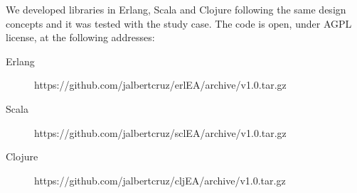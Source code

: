 
We developed libraries in Erlang, Scala and Clojure following the same design concepts and it was tested with the study case. The code is open, under AGPL license, at the following addresses:

\begin{description}
  \item[Erlang]  https://github.com/jalbertcruz/erlEA/archive/v1.0.tar.gz
  \item[Scala]   https://github.com/jalbertcruz/sclEA/archive/v1.0.tar.gz
  \item[Clojure] https://github.com/jalbertcruz/cljEA/archive/v1.0.tar.gz
\end{description} 